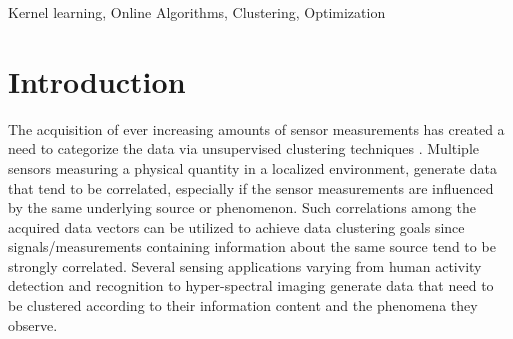 \documentclass[10pt,final]{IEEEtran}
\begin{document}
\begin{IEEEkeywords}
Kernel learning, Online Algorithms, Clustering, Optimization
\end{IEEEkeywords}






%
\IEEEpeerreviewmaketitle



\section{Introduction}
The acquisition of ever increasing amounts of sensor measurements has created a need to categorize the data via unsupervised clustering techniques {{\cite{sensors}}}. Multiple sensors measuring a physical quantity in a localized environment, generate data that tend to be correlated, especially if the sensor measurements are influenced by the same  underlying source or phenomenon. Such correlations among the acquired data vectors can be utilized to achieve data clustering goals since signals/measurements containing information about the same source tend to be strongly correlated. Several sensing applications varying from human activity detection and recognition \cite{Human_Activity} to hyper-spectral imaging \cite{Hyperspectral_Images} generate data that need to be clustered according to their information content and the phenomena they observe.
\end{document}
